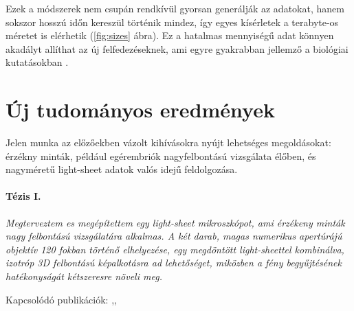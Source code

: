 \documentclass{booklet_style}
\begin{document}
Ezek a módszerek nem csupán rendkívül gyorsan generálják az adatokat, hanem sokszor hosszú időn kereszül történik mindez, így egyes kísérletek a terabyte-os méretet is elérhetik (\ref{fig:sizes} ábra).
Ez a hatalmas mennyiségű adat könnyen akadályt allíthat az új felfedezéseknek, ami egyre gyakrabban jellemző a biológiai kutatásokban \cite{wollman_high_2007,reynaud_guide_2015,perkel_struggle_2016}.









\section{Új tudományos eredmények}

Jelen munka az előzőekben vázolt kihívásokra nyújt lehetséges megoldásokat: érzékny minták, például egérembriók nagyfelbontású vizsgálata élőben, és nagyméretű light-sheet adatok valós idejű feldolgozása.

  \paragraph{Tézis I.}\textit{Megterveztem es megépítettem egy light-sheet mikroszkópot, ami érzékeny minták nagy felbontású vizsgálatára alkalmas. A két darab, magas numerikus apertúrájú objektív 120 fokban történő elhelyezése, egy megdöntött light-sheettel kombinálva, izotróp 3D felbontású képalkotásra ad lehetőséget, miközben a fény begyűjtésének hatékonyságát kétszeresre növeli meg.}
  
    Kapcsolódó publikációk: \cite{de_medeiros_light-sheet_2016},\cite{strnad_inverted_2016}, \cite{hoyer_breaking_2016}
\end{document}
